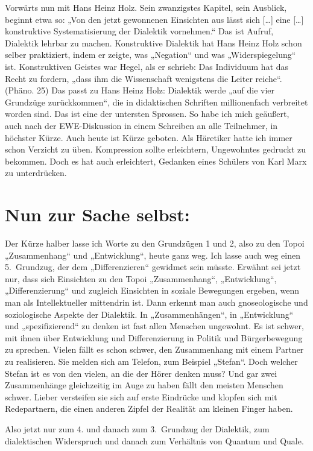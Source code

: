 \documentclass[11pt,a4paper]{article}
\begin{document}
Vorwärts nun mit Hans Heinz Holz. Sein zwanzigstes Kapitel, sein Ausblick,
beginnt etwa so: „Von den jetzt gewonnenen Einsichten aus lässt sich [\ldots]
eine [\ldots] konstruktive Systematisierung der Dialektik vornehmen.“ Das ist
Aufruf, Dialektik lehrbar zu machen. Konstruktive Dialektik hat Hans Heinz
Holz schon selber praktiziert, indem er zeigte, was „Negation“ und was
„Widerspiegelung“ ist. Konstruktiven Geistes war Hegel, als er schrieb: Das
Individuum hat das Recht zu fordern, „dass ihm die Wissenschaft wenigstens die
Leiter reiche“. (Phäno. 25) Das passt zu Hans Heinz Holz: Dialektik werde „auf
die vier Grundzüge zurückkommen“, die in didaktischen Schriften millionenfach
verbreitet worden sind. Das ist eine der untersten Sprossen. So habe ich mich
geäußert, auch nach der EWE-Diskussion in einem Schreiben an alle Teilnehmer,
in höchster Kürze. Auch heute ist Kürze geboten. Als Häretiker hatte ich immer
schon Verzicht zu üben. Kompression sollte erleichtern, Ungewohntes gedruckt
zu bekommen. Doch es hat auch erleichtert, Gedanken eines Schülers von Karl
Marx zu unterdrücken.

\section{Nun zur Sache selbst:}

Der Kürze halber lasse ich Worte zu den Grundzügen 1 und 2, also zu den Topoi
„Zusammenhang“ und „Entwicklung“, heute ganz weg. Ich lasse auch weg einen
5.~Grundzug, der dem „Differenzieren“ gewidmet sein müsste. Erwähnt sei jetzt
nur, dass sich Einsichten zu den Topoi „Zusammenhang“, „Entwicklung“,
„Differenzierung“ und zugleich Einsichten in soziale Bewegungen ergeben, wenn
man als Intellektueller mittendrin ist. Dann erkennt man auch gnoseologische
und soziologische Aspekte der Dialektik. In „Zusammenhängen“, in „Entwicklung“
und „spezifizierend“ zu denken ist fast allen Menschen ungewohnt. Es ist
schwer, mit ihnen über Entwicklung und Differenzierung in Politik und
Bürgerbewegung zu sprechen. Vielen fällt es schon schwer, den Zusammenhang mit
einem Partner zu realisieren. Sie melden sich am Telefon, zum Beispiel
„Stefan“. Doch welcher Stefan ist es von den vielen, an die der Hörer denken
muss? Und gar zwei Zusammenhänge gleichzeitig im Auge zu haben fällt den
meisten Menschen schwer. Lieber versteifen sie sich auf erste Eindrücke und
klopfen sich mit Redepartnern, die einen anderen Zipfel der Realität am
kleinen Finger haben.

Also jetzt nur zum 4. und danach zum 3.~Grundzug der Dialektik, zum
dialektischen Widerspruch und danach zum Verhältnis von Quantum und Quale.
\end{document}

